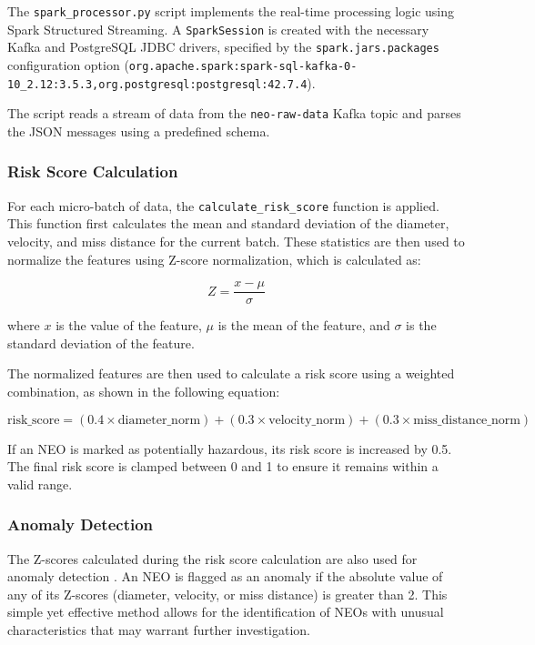 \documentclass{article}
\begin{document}
The \texttt{spark\_processor.py} script implements the real-time processing logic using Spark Structured Streaming. A \texttt{SparkSession} is created with the necessary Kafka and PostgreSQL JDBC drivers, specified by the \texttt{spark.jars.packages} configuration option (\texttt{org.apache.spark:spark-sql-kafka-0-10\_2.12:3.5.3,org.postgresql:postgresql:42.7.4}).

The script reads a stream of data from the \texttt{neo-raw-data} Kafka topic and parses the JSON messages using a predefined schema.

\subsubsection{Risk Score Calculation}

For each micro-batch of data, the \texttt{calculate\_risk\_score} function is applied. This function first calculates the mean and standard deviation of the diameter, velocity, and miss distance for the current batch. These statistics are then used to normalize the features using Z-score normalization, which is calculated as:

\begin{equation}
    Z = \frac{x - \mu}{\sigma}
\end{equation}

where $x$ is the value of the feature, $\mu$ is the mean of the feature, and $\sigma$ is the standard deviation of the feature.

The normalized features are then used to calculate a risk score using a weighted combination, as shown in the following equation:

\begin{equation}
    \text{risk\_score} = (0.4 \times \text{diameter\_norm}) + (0.3 \times \text{velocity\_norm}) + (0.3 \times \text{miss\_distance\_norm})
\end{equation}

If an NEO is marked as potentially hazardous, its risk score is increased by 0.5. The final risk score is clamped between 0 and 1 to ensure it remains within a valid range.

\subsubsection{Anomaly Detection}

The Z-scores calculated during the risk score calculation are also used for anomaly detection \cite{realtimestream2012}. An NEO is flagged as an anomaly if the absolute value of any of its Z-scores (diameter, velocity, or miss distance) is greater than 2. This simple yet effective method allows for the identification of NEOs with unusual characteristics that may warrant further investigation.
\end{document}
